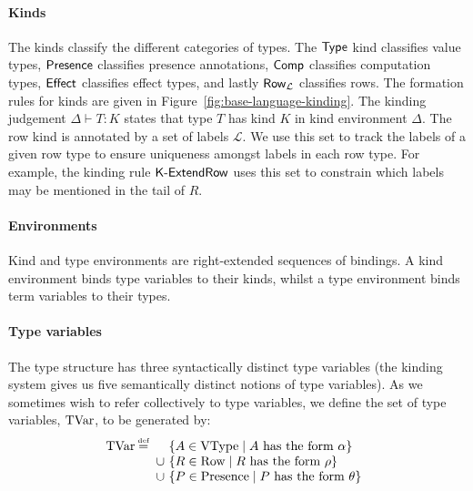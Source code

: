 \documentclass[12pt,phd,lfcs,twoside,openright,logo,leftchapter,normalheadings]{infthesis}
\theoremstyle{plain}
\theoremstyle{definition}
\begin{document}
\paragraph{Kinds}
The kinds classify the different categories of types. The $\mathsf{Type}$ kind
classifies value types, $\mathsf{Presence}$ classifies presence annotations,
$\mathsf{Comp}$ classifies computation types, $\mathsf{Effect}$ classifies effect
types, and lastly $\mathsf{Row}_{\mathcal{L}}$ classifies rows.
%
The formation rules for kinds are given in
Figure~\ref{fig:base-language-kinding}. The kinding judgement
$\Delta \vdash T : K$ states that type $T$ has kind $K$ in kind
environment $\Delta$.
%
The row kind is annotated by a set of labels $\mathcal{L}$. We use
this set to track the labels of a given row type to ensure uniqueness
amongst labels in each row type. For example, the kinding rule
$\mathsf{K\textrm{-}ExtendRow}$ uses this set to constrain which labels may be
mentioned in the tail of $R$.%

\paragraph{Environments}
Kind and type environments are right-extended sequences of bindings. A
kind environment binds type variables to their kinds, whilst a type
environment binds term variables to their types.

\paragraph{Type variables} The type structure has three syntactically
distinct type variables (the kinding system gives us five semantically
distinct notions of type variables). As we sometimes wish to refer
collectively to type variables, we define the set of type variables,
$\textrm{TVar}$, to be generated by:
%
\[
  \TyVarCat \defas
  \ba[t]{@{~}l@{~}l}
         &\{ A \in \ValTypeCat  \mid A \text{ has the form } \alpha \}\\
    \cup &\{ R \in \RowCat      \mid R \text{ has the form } \rho   \}\\
    \cup &\{ P \in \PresenceCat \mid P \text{ has the form } \theta \}
  \ea
\]
\end{document}
